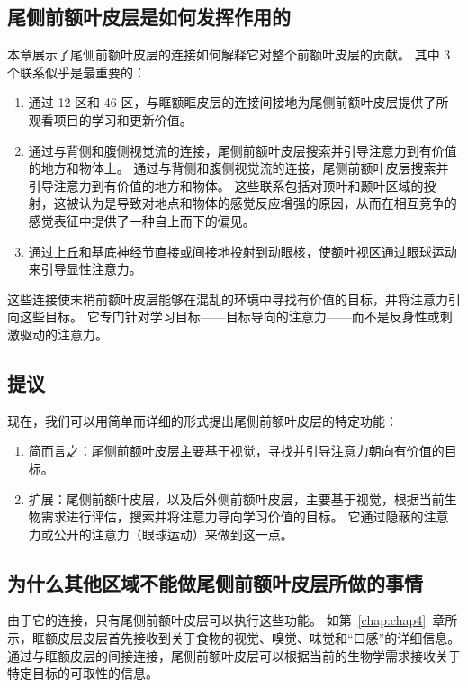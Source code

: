 \subsection{尾侧前额叶皮层是如何发挥作用的}

本章展示了尾侧前额叶皮层的连接如何解释它对整个前额叶皮层的贡献。
其中 3 个联系似乎是最重要的：

\begin{enumerate}
	\item 通过 12 区和 46 区，与眶额眶皮层的连接间接地为尾侧前额叶皮层提供了所观看项目的学习和更新价值\cite{barbas1989architecture}。
	\item 通过与背侧和腹侧视觉流的连接，尾侧前额叶皮层搜索并引导注意力到有价值的地方和物体上。
	通过与背侧和腹侧视觉流的连接，尾侧前额叶皮层搜索并引导注意力到有价值的地方和物体。
	这些联系包括对顶叶和颞叶区域的投射，这被认为是导致对地点和物体的感觉反应增强的原因，从而在相互竞争的感觉表征中提供了一种自上而下的偏见。
	\item 通过上丘和基底神经节直接或间接地投射到动眼核，使额叶视区通过眼球运动来引导显性注意力。
\end{enumerate}

这些连接使末梢前额叶皮层能够在混乱的环境中寻找有价值的目标，并将注意力引向这些目标。
它专门针对学习目标——目标导向的注意力——而不是反身性或刺激驱动的注意力。



\subsection{提议}

现在，我们可以用简单而详细的形式提出尾侧前额叶皮层的特定功能：

\begin{enumerate}
	\item 简而言之：尾侧前额叶皮层主要基于视觉，寻找并引导注意力朝向有价值的目标。
	\item 扩展：尾侧前额叶皮层，以及后外侧前额叶皮层，主要基于视觉，根据当前生物需求进行评估，搜索并将注意力导向学习价值的目标。
	它通过隐蔽的注意力或公开的注意力（眼球运动）来做到这一点。
\end{enumerate}



\subsection{为什么其他区域不能做尾侧前额叶皮层所做的事情}

由于它的连接，只有尾侧前额叶皮层可以执行这些功能。
如第~\ref{chap:chap4}~章所示，眶额皮层皮层首先接收到关于食物的视觉、嗅觉、味觉和“口感”的详细信息。
通过与眶额皮层的间接连接，尾侧前额叶皮层可以根据当前的生物学需求接收关于特定目标的可取性的信息。


